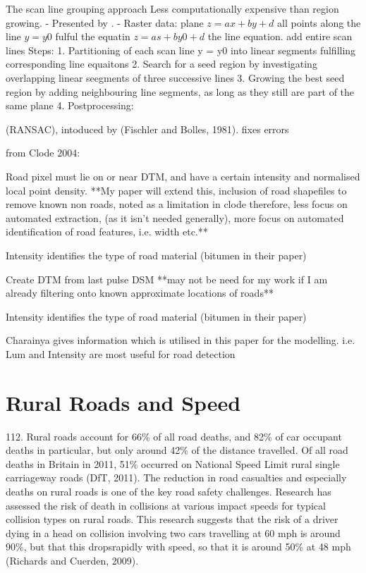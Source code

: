 \begin{multicols}{2}
The scan line grouping approach
Less computationally expensive than region growing.
- Presented by \citep{jiang1992}.
- Raster data: plane $z = ax + by + d$ all points along the line $y = y0$ fulful the equatin $z = as + by0 + d$ the line equation. add entire scan lines
Steps:
1. Partitioning of each scan line y = y0 into linear segments fulfilling corresponding line equaitons
2. Search for a seed region by investigating overlapping linear seegments of three successive lines
3. Growing the best seed region by adding neighbouring line segments, as long as they still are part of the same plane
4. Postprocessing: 

(RANSAC), intoduced by (Fischler and Bolles, 1981). fixes errors

from Clode 2004:

Road pixel must lie on or near DTM, and have a certain intensity and normalised local point density. **My paper will extend this, inclusion of road shapefiles to remove known non roads, noted as a limitation in clode therefore, less focus on automated extraction, (as it isn't needed generally), more focus on automated identification of road features, i.e. width etc.**

Intensity identifies the type of road material (bitumen in their paper)

Create DTM from last pulse DSM **may not be need for my work if I am already filtering onto known approximate locations of roads**

Intensity identifies the type of road material (bitumen in their paper)

Charainya gives information which is utilised in this paper for the modelling. i.e. Lum and Intensity are most useful for road detection

\section{Rural Roads and Speed}

112. Rural roads account for 66\% of all road deaths, and 82\% of car
occupant deaths in particular, but only around 42\% of the distance
travelled. Of all road deaths in Britain in 2011, 51\% occurred on National
Speed Limit rural single carriageway roads (DfT, 2011). The reduction in
road casualties and especially deaths on rural roads is one of the key road
safety challenges. Research has assessed the risk of death in collisions at
various impact speeds for typical collision types on rural roads. This
research suggests that the risk of a driver dying in a head on collision
involving two cars travelling at 60 mph is around 90\%, but that this dropsrapidly with speed, so that it is around 50\% at 48 mph (Richards and Cuerden, 2009).


\end{multicols}
